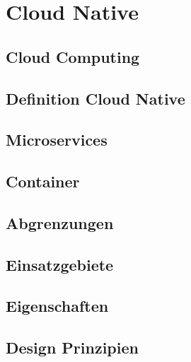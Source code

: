 \chapter{Cloud Native}

\section{Cloud Computing}
\section{Definition Cloud Native}
\section{Microservices}
\section{Container}
\section{Abgrenzungen}
\section{Einsatzgebiete}
\section{Eigenschaften}
\section{Design Prinzipien}